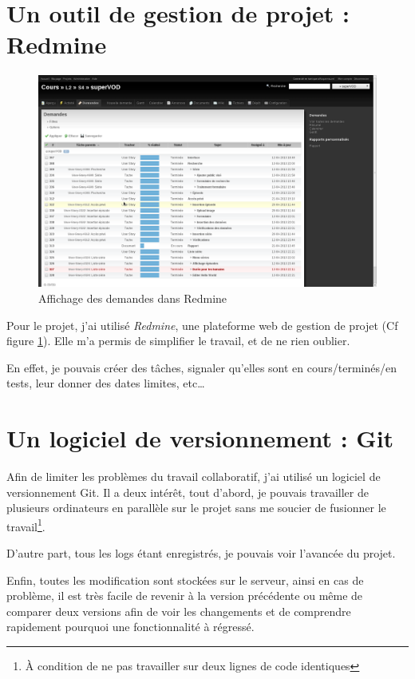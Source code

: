 \documentclass[12pt,a4paper,openany]{book}
\begin{document}
	\section{Un outil de gestion de projet : Redmine}
	\begin{figure}[H]
		\centering
		\includegraphics[width=18cm]{screens/redmine.png} %
		\caption{Affichage des demandes dans Redmine}
		\label{fig:redmine}
	\end{figure}
	Pour le projet, j'ai utilisé \textit{Redmine}, une plateforme web de gestion de projet (Cf figure \ref{fig:redmine}). Elle m'a permis 
	de simplifier le travail, et de ne rien oublier.

	En effet, je pouvais créer des tâches, signaler qu'elles sont en cours/terminés/en tests, leur donner des dates limites,
	etc\ldots 

	\section{Un logiciel de versionnement : Git}
	Afin de limiter les problèmes du travail collaboratif, j'ai utilisé un logiciel de versionnement Git. Il a deux intérêt, tout
	d'abord, je pouvais travailler de plusieurs ordinateurs en parallèle sur le projet sans me soucier de fusionner le travail\footnote{À condition de ne pas travailler sur deux lignes de code identiques}.

	D'autre part, tous les logs étant enregistrés, je pouvais voir l'avancée du projet. 

	Enfin, toutes les modification sont stockées sur le serveur, ainsi en cas de problème, il est très facile de revenir à la version précédente ou même de
	comparer deux versions afin de voir les changements et de comprendre rapidement pourquoi une fonctionnalité à régressé. 
\end{document}
